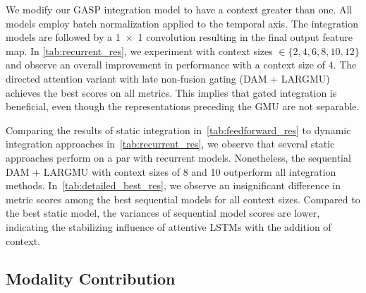 \documentclass{article}
\begin{document}
We modify our GASP integration model to have a context greater than one. 
All models employ batch normalization applied to the temporal axis. The integration models are followed by a 1~$\times$~1 convolution resulting in the final output feature map. In \autoref{tab:recurrent_res}, we experiment with context sizes $\in\{2,4,6,8,10,12\}$ and observe an overall improvement in performance with a context size of 4. The directed attention variant with late non-fusion gating (DAM + LARGMU) achieves the best scores on all metrics. This implies that gated integration is beneficial, even though the representations preceding the GMU are not separable. 

Comparing the results of static integration in~\autoref{tab:feedforward_res} to dynamic integration approaches in~\autoref{tab:recurrent_res}, we observe that several static approaches perform on a par with recurrent models. Nonetheless, the sequential DAM + LARGMU with context sizes of 8 and 10 outperform all integration methods. In~\autoref{tab:detailed_best_res}, we observe an insignificant difference in metric scores among the best sequential models for all context sizes. Compared to the best static model, the variances of sequential model scores are lower, indicating the stabilizing influence of attentive LSTMs with the addition of context.

\subsection{Modality Contribution}

\begin{table}[H]
\centering
\caption{Social cue modality ablation applied to our best GASP model (DAM + LARGMU; Context Size = 10).}
\label{tab:ablation_res}
 \end{table}
 
\end{document}
